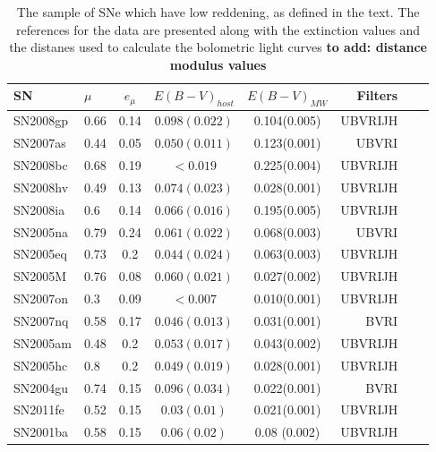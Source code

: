 \begin{table*}
\caption{The sample of SNe which have low reddening, as defined in the text. The references for the data are presented along with the extinction values and the distanes used to calculate the bolometric light curves  {\bf to add: distance modulus values }}

\begin{center}
\begin{tabular}{llcccrrr}
\hline
SN  & $\mu$ & $e_{\mu}$  & $E(B-V)_{host}$ & $E(B-V)_{MW}$ & Filters \\
\hline
SN2008gp	&	0.66	&	0.14		&	$0.098(0.022)$	&	0.104(0.005)	& UBVRIJH	\\
SN2007as	&	0.44	&	0.05		&	$0.050(0.011)$	&	0.123(0.001)	& UBVRI	\\
SN2008bc	&	0.68	&	0.19		&	$<0.019$	&	0.225(0.004)	& UBVRIJH	\\
SN2008hv	&	0.49	&	0.13		&	$0.074(0.023)$	&	0.028(0.001)	& UBVRIJH	\\
SN2008ia	&	0.6	&	0.14		&	$0.066(0.016)$	&	0.195(0.005)	& UBVRIJH	\\
SN2005na	&	0.79	&	0.24		&	$0.061(0.022)$	&	0.068(0.003)	& UBVRI	\\
SN2005eq	&	0.73	&	0.2		&	$0.044(0.024)$	&	0.063(0.003)	& UBVRIJH	\\
SN2005M		&	0.76	&	0.08		&	$0.060(0.021)$	&	0.027(0.002)	& UBVRIJH	\\
SN2007on	&	0.3	&	0.09		&	$<0.007$	&	0.010(0.001)	& UBVRIJH	\\
SN2007nq	&	0.58	&	0.17		&	$0.046(0.013)$	&	0.031(0.001)	& BVRI	\\
SN2005am	&	0.48	&	0.2		&	$0.053(0.017)$	&	0.043(0.002)	& UBVRIJH	\\
SN2005hc	&	0.8	&	0.2		&	$0.049(0.019)$	&	0.028(0.001)	& UBVRIJH	\\
SN2004gu	&	0.74	&	0.15		&	$0.096(0.034)$	&	0.022(0.001)	& BVRI	\\
SN2011fe	&	0.52	&	0.15		&	$0.03 (0.01)$	&	0.021(0.001)	& UBVRIJH	\\
SN2001ba	&	0.58	&	0.15		&	$ 0.06 (0.02)$  &     0.08 (0.002)	& UBVRIJH	\\

\end{tabular}
\end{center}
\end{table*}
